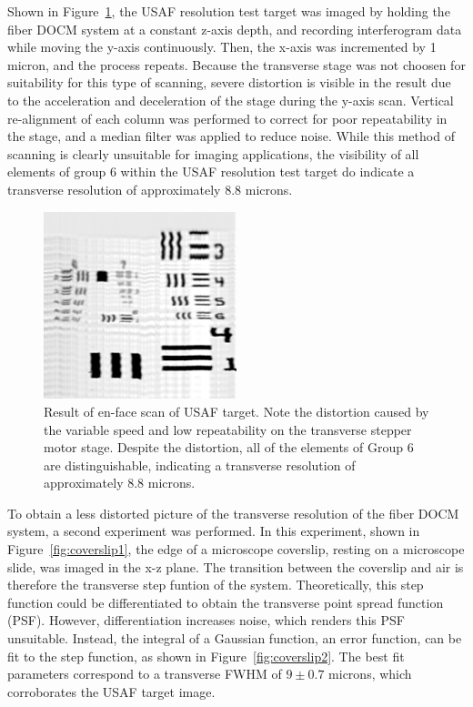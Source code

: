 Shown in Figure~\ref{fig:usaf}, the USAF resolution test target was imaged by holding the fiber DOCM system at a constant z-axis depth, and recording interferogram data while moving the y-axis continuously. Then, the x-axis was incremented by 1 micron, and the process repeats. Because the transverse stage was not choosen for suitability for this type of scanning, severe distortion is visible in the result due to the acceleration and deceleration of the stage during the y-axis scan. Vertical re-alignment of each column was performed to correct for poor repeatability in the stage, and a median filter was applied to reduce noise. While this method of scanning is clearly unsuitable for imaging applications, the visibility of all elements of group 6 within the USAF resolution test target do indicate a transverse resolution of approximately 8.8 microns.

\begin{figure}[h!]
\centering
\includegraphics[width=0.5\textwidth]{Images/Results/en-face-usaf.png}
\caption[Result of en-face scan of USAF target.]{Result of en-face scan of USAF target. Note the distortion caused by the variable speed and low repeatability on the transverse stepper motor stage. Despite the distortion, all of the elements of Group 6 are distinguishable, indicating a transverse resolution of approximately 8.8 microns.\label{fig:usaf}}
\end{figure}

To obtain a less distorted picture of the transverse resolution of the fiber DOCM system, a second experiment was performed. In this experiment, shown in Figure~\ref{fig:coverslip1}, the edge of a microscope coverslip, resting on a microscope slide, was imaged in the x-z plane. The transition between the coverslip and air is therefore the transverse step funtion of the system. Theoretically, this step function could be differentiated to obtain the transverse point spread function (PSF). However, differentiation increases noise, which renders this PSF unsuitable. Instead, the integral of a Gaussian function, an error function, can be fit to the step function, as shown in Figure~\ref{fig:coverslip2}. The best fit parameters correspond to a transverse FWHM of $9 \pm 0.7$ microns, which corroborates the USAF target image.

